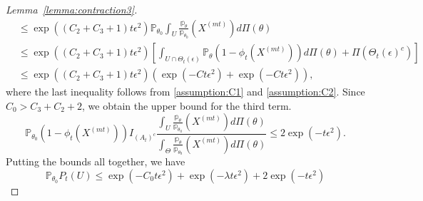 \documentclass[10pt,a4paper]{amsart}
\newcommand\bP{\mathbb{P}}
\newcommand\bp{\mathbb{p}}
\begin{document}
\begin{proof}[Lemma~\ref{lemma:contraction3}]
\begin{align*}
  &\leq \exp((C_2 + C_3 + 1) t \epsilon^2)\bP_{\theta_0} \int_{U} \frac{\bp_\theta}{\bp_{\theta_0}}(X^{(mt)}) d \Pi(\theta) \\
  &\leq \exp((C_2 + C_3 + 1) t \epsilon^2)\left[\int_{U \cap \Theta_t(\epsilon)} \bP_\theta (1- \phi_t (X^{(mt)})) d \Pi(\theta) + \Pi\left(\Theta_t(\epsilon)^c\right) \right] \\
 & \leq \exp((C_2 + C_3 + 1) t \epsilon^2)(\exp(-C t \epsilon^2) + \exp(-C t \epsilon^2)), 
\end{align*}
where the last inequality follows from \ref{assumption:C1} and \ref{assumption:C2}. Since $C_0 > C_3 + C_2 + 2$, we obtain the upper bound for the third term. 
\begin{equation*}
    \bP_{\theta_0} (1 - \phi_t(X^{(mt)})) I_{(A_t)^c} \frac{\int_{U} \frac{\bp_\theta}{\bp_{\theta_0}}(X^{(mt)}) d \Pi(\theta)}{\int_{\Theta} \frac{\bp_\theta}{\bp_{\theta_0}}(X^{(mt)}) d \Pi(\theta)}  \leq 2 \exp(- t \epsilon^2). 
\end{equation*}
Putting the bounds all together, we have
\begin{equation*}
    \bP_{\theta_0}  P_t (U) \leq \exp(-C_0 t \epsilon^2) + \exp(-\lambda t \epsilon^2) + 2 \exp(-t \epsilon^2)
\end{equation*}
\end{proof}
\end{document}
